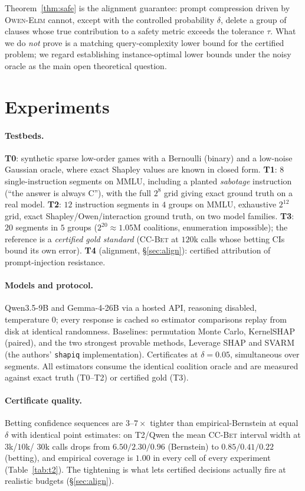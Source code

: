 \documentclass[10pt,twocolumn,letterpaper]{article}
\theoremstyle{plain}
\theoremstyle{definition}
\begin{document}
Theorem~\ref{thm:safe} is the alignment guarantee: prompt compression driven by
\textsc{Owen-Elim} cannot, except with the controlled probability $\delta$,
delete a group of clauses whose true contribution to a safety metric exceeds the
tolerance $\tau$. What we do \emph{not} prove is a matching query-complexity
lower bound for the certified problem; we regard establishing instance-optimal
lower bounds under the noisy oracle as the main open theoretical question.

\section{Experiments}
\label{sec:exp}

\paragraph{Testbeds.} \textbf{T0}: synthetic sparse low-order games with a
Bernoulli (binary) and a low-noise Gaussian oracle, where exact Shapley values
are known in closed form. \textbf{T1}: $8$ single-instruction segments on MMLU,
including a planted \emph{sabotage} instruction (``the answer is always C''),
with the full $2^8$ grid giving exact ground truth on a real model. \textbf{T2}:
$12$ instruction segments in $4$ groups on MMLU, exhaustive $2^{12}$ grid, exact
Shapley/Owen/interaction ground truth, on two model families. \textbf{T3}: $20$
segments in $5$ groups ($2^{20}\!\approx\!1.05$M coalitions, enumeration
impossible); the reference is a \emph{certified gold standard}
(\textsc{CC-Bet} at $120$k calls whose betting CIs bound its own error).
\textbf{T4} (alignment, \S\ref{sec:align}): certified attribution of
prompt-injection resistance.

\paragraph{Models and protocol.} Qwen3.5-9B and Gemma-4-26B via a hosted API,
reasoning disabled, temperature $0$; every response is cached so estimator
comparisons replay from disk at identical randomness. Baselines: permutation
Monte Carlo, KernelSHAP (paired), and the two strongest provable methods,
Leverage SHAP and SVARM (the authors' \texttt{shapiq} implementation).
Certificates at $\delta=0.05$, simultaneous over segments. All estimators consume
the identical coalition oracle and are measured against exact truth (T0--T2) or
certified gold (T3).

\paragraph{Certificate quality.} Betting confidence sequences are
$3$--$7\times$ tighter than empirical-Bernstein at equal $\delta$ with identical
point estimates: on T2/Qwen the mean \textsc{CC-Bet} interval width at $3$k/$10$k/
$30$k calls drops from $6.50/2.30/0.96$ (Bernstein) to $0.85/0.41/0.22$
(betting), and empirical coverage is $1.00$ in every cell of every experiment
(Table~\ref{tab:t2}). The tightening is what lets certified decisions actually
fire at realistic budgets (\S\ref{sec:align}).
\end{document}
